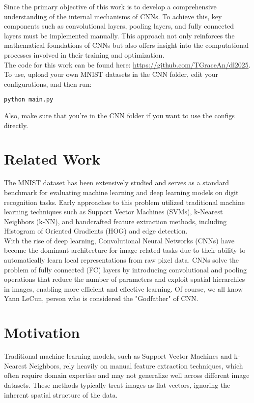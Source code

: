 \documentclass[conference]{IEEEtran}
\begin{document}
\noindent Since the primary objective of this work is to develop a comprehensive understanding of the internal mechanisms of CNNs. To achieve this, key components such as convolutional layers, pooling layers, and fully connected layers must be implemented manually. This approach not only reinforces the mathematical foundations of CNNs but also offers insight into the computational processes involved in their training and optimization. \\

\noindent The code for this work can be found here: \url{https://github.com/TGraceAn/dl2025}. To use, upload your own MNIST datasets in the CNN folder, edit your configurations, and then run:
\begin{verbatim}
python main.py
\end{verbatim}
Also, make sure that you're in the CNN folder if you want to use the configs directly.

\section{Related Work}
The MNIST dataset has been extensively studied and serves as a standard benchmark for evaluating machine learning and deep learning models on digit recognition tasks. Early approaches to this problem utilized traditional machine learning techniques such as Support Vector Machines (SVMs), k-Nearest Neighbors (k-NN), and handcrafted feature extraction methods, including Histogram of Oriented Gradients (HOG) and edge detection.\\

\noindent With the rise of deep learning, Convolutional Neural Networks (CNNs) have become the dominant architecture for image-related tasks due to their ability to automatically learn local representations from raw pixel data. CNNs solve the problem of fully connected (FC) layers by introducing convolutional and pooling operations that reduce the number of parameters and exploit spatial hierarchies in images, enabling more efficient and effective learning. Of course, we all know Yann LeCun, person who is considered the "Godfather" of CNN.

\section{Motivation}
Traditional machine learning models, such as Support Vector Machines and k-Nearest Neighbors, rely heavily on manual feature extraction techniques, which often require domain expertise and may not generalize well across different image datasets. These methods typically treat images as flat vectors, ignoring the inherent spatial structure of the data.\\
\end{document}
